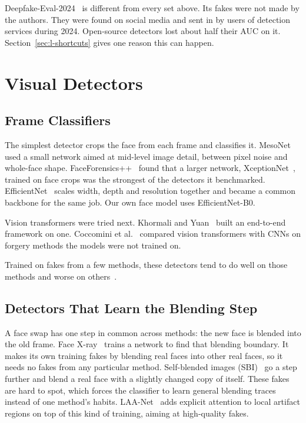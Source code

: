 Deepfake-Eval-2024~\cite{dfeval2024} is different from every set above. Its
fakes were not made by the authors. They were found on social media and sent
in by users of detection services during 2024. Open-source detectors lost
about half their AUC on it. Section~\ref{sec:l-shortcuts} gives one reason
this can happen.

\section{Visual Detectors}
\label{sec:l-visual}

\subsection{Frame Classifiers}

The simplest detector crops the face from each frame and classifies it.
MesoNet~\cite{mesonet} used a small network aimed at mid-level image detail,
between pixel noise and whole-face shape. FaceForensics++~\cite{ffpp} found
that a larger network, XceptionNet~\cite{xception}, trained on face crops was
the strongest of the detectors it benchmarked. EfficientNet~\cite{efficientnet}
scales width, depth and resolution together and became a common backbone for
the same job. Our own face model uses EfficientNet-B0.

Vision transformers were tried next. Khormali and Yuan~\cite{khormali2022}
built an end-to-end framework on one. Coccomini et al.~\cite{coccomini2022}
compared vision transformers with CNNs on forgery methods the models were not
trained on.

Trained on fakes from a few methods, these detectors tend to do well on
those methods and worse on others~\cite{deepfakebench}.

\subsection{Detectors That Learn the Blending Step}

A face swap has one step in common across methods: the new face is blended
into the old frame. Face X-ray~\cite{facexray} trains a network to find that
blending boundary. It makes its own training fakes by blending real faces
into other real faces, so it needs no fakes from any particular method.
Self-blended images (SBI)~\cite{sbi} go a step further and blend a real face
with a slightly changed copy of itself. These fakes are hard to spot, which
forces the classifier to learn general blending traces instead of one
method's habits. LAA-Net~\cite{laanet} adds explicit attention to local
artifact regions on top of this kind of training, aiming at high-quality
fakes.

